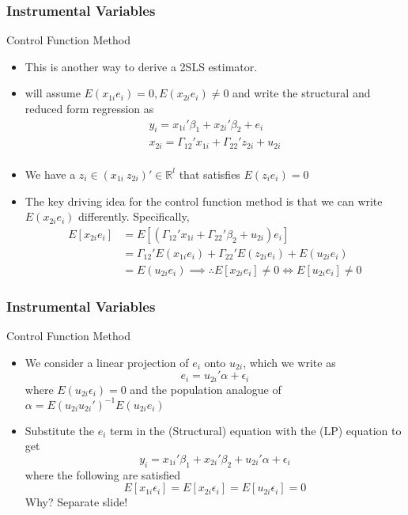 \documentclass{beamer}
\begin{document}
\begin{frame}
\frametitle{Instrumental Variables}
Control Function Method
\begin{itemize}
\item This is another way to derive a 2SLS estimator. 
\item  will assume $E(x_{1i}e_i)=0, E(x_{2i}e_i)\neq0$ and write the structural and reduced form regression as
\begin{gather*}
y_i = x_{1i}'\beta_1 + x_{2i}'\beta_2+e_i \tag{Structural}\\
x_{2i}=\Gamma_{12}'x_{1i}+\Gamma_{22}'z_{2i}+u_{2i} \tag{Reduced Form}\\
\end{gather*}
\item We have a $z_i\in( x_{1i}\  z_{2i})'\in\mathbb{R}^l$ that satisfies $E(z_ie_i)=0$
\item The key driving idea for the control function method is that we can write $E(x_{2i}e_i)$ differently. Specifically, 
\[
\begin{aligned}
E[x_{2i}e_i]&= E[(\Gamma_{12}'x_{1i}+\Gamma_{22}'\beta_2+u_{2i})e_i]\\
&= \Gamma_{12}'E(x_{1i}e_i)+\Gamma_{22}'E(z_{2i}e_i)+E(u_{2i}e_i)\\
&= E(u_{2i}e_i) \implies \therefore E[x_{2i}e_i]\neq 0 \iff E[u_{2i}e_i]\neq 0 
\end{aligned}
\]
\end{itemize}
\end{frame}

\begin{frame}
\frametitle{Instrumental Variables}
Control Function Method
\begin{itemize}
\item We consider a linear projection of $e_i$ onto $u_{2i}$, which we write as
\[
e_i  = u_{2i}'\alpha+\epsilon_i \tag{LP}
\]
where $E(u_{2i}\epsilon_i)=0$ and the population analogue of $\alpha=E(u_{2i}u_{2i}')^{-1}E(u_{2i}e_i)$
\item Substitute the $e_i$ term in the (Structural) equation with the (LP) equation to get
\[
y_i = x_{1i}'\beta_1 + x_{2i}'\beta_2+ u_{2i}'\alpha+\epsilon_i   \tag{CFA}
\]
where the following are satisfied
\[
E[x_{1i}\epsilon_i]=E[x_{2i}\epsilon_i]=E[u_{2i}\epsilon_i]=0
\]
Why? Separate slide!
\end{itemize}
\end{frame}
\end{document}
